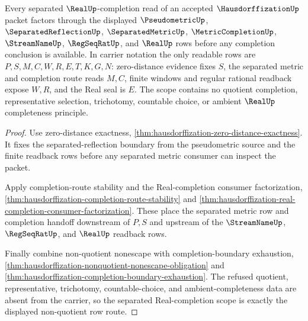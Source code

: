 \begin{theorem}
\label{thm:hausdorffization-separated-real-completion-scope}
Every separated $\RealUp$-completion read of an accepted $\HausdorffizationUp$ packet factors through the displayed $\PseudometricUp$, $\SeparatedReflectionUp$, $\SeparatedMetricUp$, $\MetricCompletionUp$, $\StreamNameUp$, $\RegSeqRatUp$, and $\RealUp$ rows before any completion conclusion is available. In carrier notation the only readable rows are $P,S,M,C,W,R,E,T,K,G,N$: zero-distance evidence fixes $S$, the separated metric and completion route reads $M,C$, finite windows and regular rational readback expose $W,R$, and the Real seal is $E$. The scope contains no quotient completion, representative selection, trichotomy, countable choice, or ambient $\RealUp$ completeness principle.
\end{theorem}
\begin{proof}
Use zero-distance exactness, \autoref{thm:hausdorffization-zero-distance-exactness}. It fixes the separated-reflection boundary from the pseudometric source and the finite readback rows before any separated metric consumer can inspect the packet.

Apply completion-route stability and the Real-completion consumer factorization, \autoref{thm:hausdorffization-completion-route-stability} and \autoref{thm:hausdorffization-real-completion-consumer-factorization}. These place the separated metric row and completion handoff downstream of $P,S$ and upstream of the $\StreamNameUp$, $\RegSeqRatUp$, and $\RealUp$ readback rows.

Finally combine non-quotient nonescape with completion-boundary exhaustion, \autoref{thm:hausdorffization-nonquotient-nonescape-obligation} and \autoref{thm:hausdorffization-completion-boundary-exhaustion}. The refused quotient, representative, trichotomy, countable-choice, and ambient-completeness data are absent from the carrier, so the separated Real-completion scope is exactly the displayed non-quotient row route.
\end{proof}

